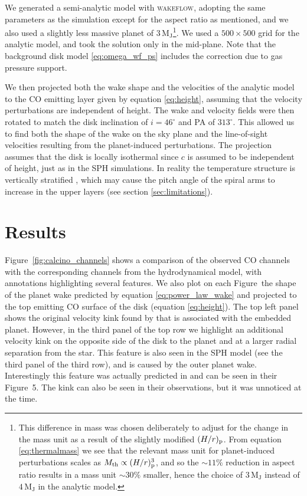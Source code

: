 We generated a semi-analytic model with \textsc{wakeflow}, adopting the same parameters as the simulation except for the aspect ratio as mentioned, and we also used a slightly less massive planet of $3 \, \mathrm{M_J}$\footnote{This difference in mass was chosen deliberately to adjust for the change in the mass unit as a result of the slightly modified $(H/r)_{\rm p}$. From equation \ref{eq:thermalmass} we see that the relevant mass unit for planet-induced perturbations scales as $M_{\rm th} \propto (H/r)_{\rm p}^3$, and so the $\sim 11 \%$ reduction in aspect ratio results in a mass unit $\sim 30 \%$ smaller, hence the choice of $3 \, \mathrm{M_J}$ instead of $4 \, \mathrm{M_J}$ in the analytic model.}.
We used a $500 \times 500$ grid for the analytic model, and took the solution only in the mid-plane.
Note that the background disk model \ref{eq:omega_wf_ps} includes the correction due to gas pressure support.

We then projected both the wake shape and the velocities of the analytic model to the CO emitting layer given by equation \ref{eq:height}, assuming that the velocity perturbations are independent of height.
The wake and velocity fields were then rotated to match the disk inclination of $i=46^{\circ}$ and PA of $313^{\circ}$.
This allowed us to find both the shape of the wake on the sky plane and the line-of-sight velocities resulting from the planet-induced perturbations.
The projection assumes that the disk is locally isothermal since $c$ is assumed to be independent of height, just as in the SPH simulations.
In reality the temperature structure is vertically stratified \citep{calahan2021}, which may cause the pitch angle of the spiral arms to increase in the upper layers (see section \ref{sec:limitations}).

\section{Results}

Figure~\ref{fig:calcino_channels} shows a comparison of the observed CO channels with the corresponding channels from the hydrodynamical model, with annotations highlighting several features.
We also plot on each Figure~the shape of the planet wake predicted by equation \ref{eq:power_law_wake} and projected to the top emitting CO surface of the disk (equation \ref{eq:height}).
The top left panel shows the original velocity kink found by \citep{pinte2018a} that is associated with the embedded planet.
However, in the third panel of the top row we highlight an additional velocity kink on the opposite side of the disk to the planet and at a larger radial separation from the star.
This feature is also seen in the SPH model (see the third panel of the third row), and is caused by the outer planet wake.
Interestingly this feature was actually predicted in \citep{pinte2018a} and can be seen in their Figure~5.
The kink can also be seen in their observations, but it was unnoticed at the time.

